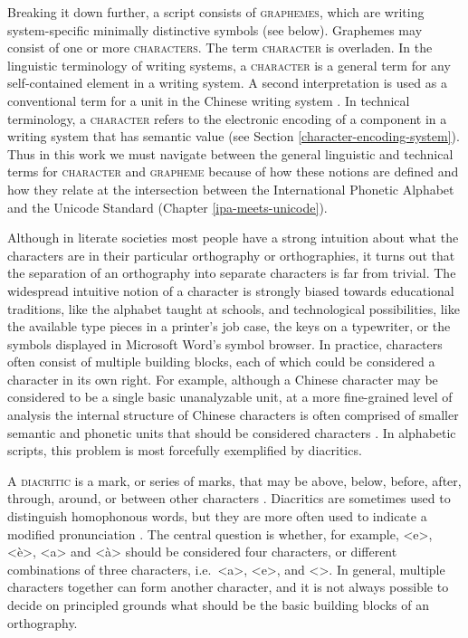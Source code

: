 Breaking it down further, a script consists of \textsc{graphemes}, which are writing 
system-specific minimally distinctive symbols (see below). Graphemes may consist of one or more 
\textsc{characters}. The term \textsc{character} is overladen. In the linguistic terminology of writing
systems, a \textsc{character} is a general term for any self-contained element
in a writing system. A second interpretation is used as a conventional term for a unit in the Chinese writing
system \citep{Daniels1996}. In technical terminology, a \textsc{character} 
refers to the electronic encoding of a component in a writing system that has semantic 
value (see Section \ref{character-encoding-system}). Thus in this work we must navigate 
between the general linguistic and technical terms for \textsc{character} 
and \textsc{grapheme} because of how these notions are defined and how they relate at the intersection 
between the International Phonetic Alphabet and the Unicode Standard (Chapter \ref{ipa-meets-unicode}).

Although in literate societies most people have a strong intuition
about what the characters are in their particular orthography or orthographies,
it turns out that the separation of an orthography into separate characters is
far from trivial. The widespread intuitive notion of a character is strongly
biased towards educational traditions, like the alphabet taught at schools, and
technological possibilities, like the available type pieces in a printer's job
case, the keys on a typewriter, or the symbols displayed in Microsoft Word's
symbol browser. In practice, characters often consist of multiple building
blocks, each of which could be considered a character in its own right. For
example, although a Chinese character may be considered to be a single basic
unanalyzable unit, at a more fine-grained level of analysis the internal
structure of Chinese characters is often comprised of smaller semantic and
phonetic units that should be considered characters \citep{Sproat2000}. In
alphabetic scripts, this problem is most forcefully exemplified by diacritics. 

A \textsc{diacritic} is a mark, or series of marks, that may be above, below, 
before, after, through, around, or between other characters \citep{Gaultney2002}. Diacritics are sometimes used to
distinguish homophonous words, but they are more often used to indicate a
modified pronunciation \citep[xli]{DanielsBright1996}. The central question is
whether, for example, <e>, <è>, <a> and <à> should be considered four
characters, or different combinations of three characters, i.e.\ <a>, <e>, and <>. 
In general, multiple characters together can form another character, and it is not always possible to
decide on principled grounds what should be the basic building blocks of an
orthography.

